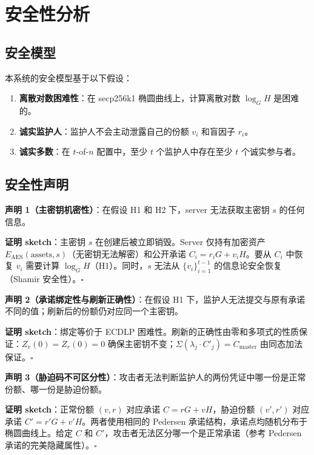 \section{安全性分析}

\subsection{安全模型}

本系统的安全模型基于以下假设：

\begin{enumerate}[label=H\arabic*:]
    \item \textbf{离散对数困难性}：在 secp256k1 椭圆曲线上，计算离散对数 $\log_G H$ 是困难的。
    \item \textbf{诚实监护人}：监护人不会主动泄露自己的份额 $v_i$ 和盲因子 $r_i$。
    \item \textbf{诚实多数}：在 $t$-of-$n$ 配置中，至少 $t$ 个监护人中存在至少 $t$ 个诚实参与者。
\end{enumerate}

\subsection{安全性声明}

\textbf{声明 1（主密钥机密性）}：在假设 H1 和 H2 下，server 无法获取主密钥 $s$ 的任何信息。

\textbf{证明 sketch}：主密钥 $s$ 在创建后被立即销毁。Server 仅持有加密资产 $E_{\text{AES}}(\text{assets}, s)$（无密钥无法解密）和公开承诺 $C_i = r_iG + v_iH$。要从 $C_i$ 中恢复 $v_i$ 需要计算 $\log_G H$（H1）。同时，$s$ 无法从 $\{v_i\}_{i=1}^{t-1}$ 的信息论安全恢复（Shamir 安全性）。$\square$

\textbf{声明 2（承诺绑定性与刷新正确性）}：在假设 H1 下，监护人无法提交与原有承诺不同的值；刷新后的份额仍对应同一个主密钥。

\textbf{证明 sketch}：绑定等价于 ECDLP 困难性。刷新的正确性由零和多项式的性质保证：$Z_v(0) = Z_r(0) = 0$ 确保主密钥不变；$\Sigma(\lambda_j \cdot C'_j) = C_{\text{master}}$ 由同态加法保证。$\square$

\textbf{声明 3（胁迫码不可区分性）}：攻击者无法判断监护人的两份凭证中哪一份是正常份额、哪一份是胁迫份额。

\textbf{证明 sketch}：正常份额 $(v, r)$ 对应承诺 $C = rG + vH$，胁迫份额 $(v', r')$ 对应承诺 $C' = r'G + v'H$。两者使用相同的 Pedersen 承诺结构，承诺点均随机分布于椭圆曲线上。给定 $C$ 和 $C'$，攻击者无法区分哪一个是正常承诺（参考 Pedersen 承诺的完美隐藏属性）。$\square$

